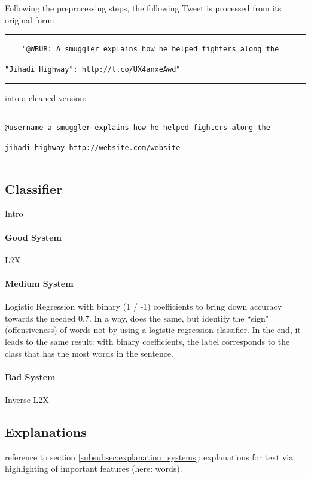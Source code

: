 Following the preprocessing steps, the following Tweet is processed from its original form:
\medskip \hrule \medskip
\begin{verbatim}
	"@WBUR: A smuggler explains how he helped fighters along the \end{verbatim}\begin{verbatim}"Jihadi Highway": http://t.co/UX4anxeAwd"
\end{verbatim}
\medskip \hrule \medskip
into a cleaned version:
\medskip \hrule \medskip
\begin{verbatim}
@username a smuggler explains how he helped fighters along the \end{verbatim}\begin{verbatim}jihadi highway http://website.com/website
\end{verbatim}
\medskip \hrule \medskip





\subsection{Classifier}
Intro

\paragraph{Good System}
L2X 

\paragraph{Medium System}
Logistic Regression with binary (1 / -1) coefficients to bring down accuracy towards the needed 0.7. In a way, \cite{klenner2018offensive} does the same, but identify the ``sign" (offensiveness) of words not by using a logistic regression classifier. In the end, it leads to the same result: with binary coefficients, the label corresponds to the class that has the most words in the sentence.

\paragraph{Bad System}
Inverse L2X



\subsection{Explanations}
reference to section \ref{subsubsec:explanation_systems}: explanations for text via highlighting of important features (here: words). 

